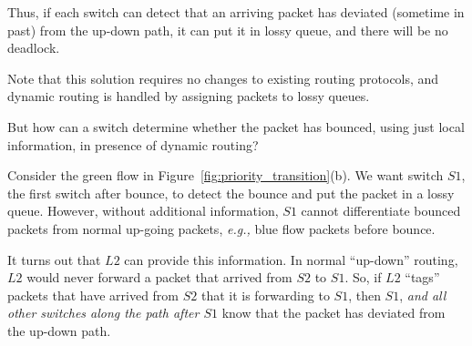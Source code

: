 Thus, if each switch can detect that an arriving packet has deviated (sometime
in past) from the up-down path, it can put it in lossy queue, and there will be
no deadlock.

Note that this solution requires no changes to existing routing protocols, and
dynamic routing is handled by assigning packets to lossy queues.

But how can a switch determine whether the packet has bounced, using just local
information, in presence of dynamic routing?


Consider the green flow in Figure~\ref{fig:priority_transition}(b).  We want
switch $S1$, the first switch after bounce, to detect the bounce and put the
packet in a lossy queue. However, without additional information, $S1$ cannot
differentiate bounced packets from normal up-going packets, {\em e.g.,} blue
flow packets before bounce. 

It turns out that $L2$ can provide this information.  In normal ``up-down''
routing, $L2$ would never forward a packet that arrived from $S2$ to $S1$. So,
if $L2$ ``tags'' packets that have arrived from $S2$ that it is forwarding to $S1$,
then $S1$, {\em and all other switches along the path after $S1$} know that the
packet has deviated from the up-down path.

